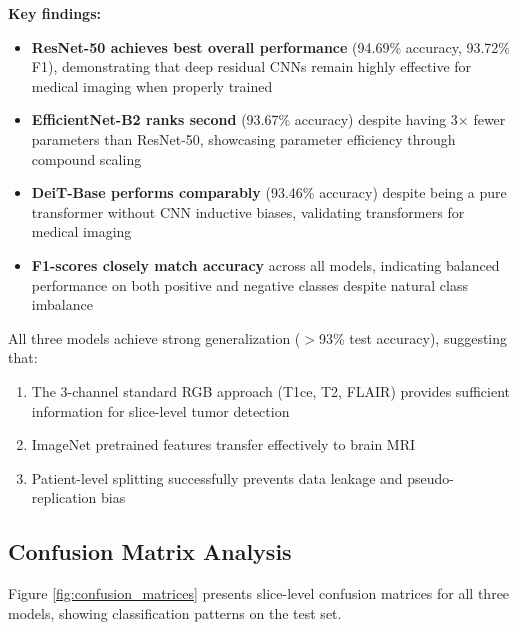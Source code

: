 \textbf{Key findings:}

\begin{itemize}
    \item \textbf{ResNet-50 achieves best overall performance} (94.69\% accuracy, 93.72\% F1), demonstrating that deep residual CNNs remain highly effective for medical imaging when properly trained
    \item \textbf{EfficientNet-B2 ranks second} (93.67\% accuracy) despite having 3× fewer parameters than ResNet-50, showcasing parameter efficiency through compound scaling
    \item \textbf{DeiT-Base performs comparably} (93.46\% accuracy) despite being a pure transformer without CNN inductive biases, validating transformers for medical imaging
    \item \textbf{F1-scores closely match accuracy} across all models, indicating balanced performance on both positive and negative classes despite natural class imbalance
\end{itemize}

All three models achieve strong generalization ($>$93\% test accuracy), suggesting that:
\begin{enumerate}
    \item The 3-channel standard RGB approach (T1ce, T2, FLAIR) provides sufficient information for slice-level tumor detection
    \item ImageNet pretrained features transfer effectively to brain MRI
    \item Patient-level splitting successfully prevents data leakage and pseudo-replication bias
\end{enumerate}

\subsection{Confusion Matrix Analysis}

Figure \ref{fig:confusion_matrices} presents slice-level confusion matrices for all three models, showing classification patterns on the test set.

